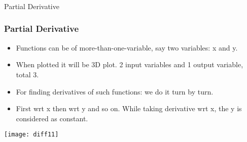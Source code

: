 \begin{frame}[fragile]\frametitle{}
\begin{center}
{\Large Partial Derivative}
\end{center}
\end{frame}


 \begin{frame}[fragile] \frametitle{Partial Derivative}
\begin{itemize}
\item Functions can be of more-than-one-variable, say two variables: x and y. 
\item When plotted it will be 3D plot. 2 input variables and 1 output variable, total 3.
\item For finding derivatives of such functions: we do it turn by turn. 
\item First wrt x then wrt y and so on. While taking derivative wrt x, the y is considered as constant.
\end{itemize}
\begin{center}
\texttt{[image: diff11]}
\end{center}
\end{frame}




 


  

